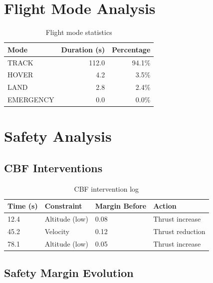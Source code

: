 \section{Flight Mode Analysis}

\begin{table}[htbp]
    \centering
    \caption{Flight mode statistics}
    \label{tab:mode_stats}
    \begin{tabular}{@{}lrr@{}}
        \toprule
        \textbf{Mode} & \textbf{Duration (s)} & \textbf{Percentage} \\
        \midrule
        TRACK & 112.0 & 94.1\% \\
        HOVER & 4.2 & 3.5\% \\
        LAND & 2.8 & 2.4\% \\
        EMERGENCY & 0.0 & 0.0\% \\
        \bottomrule
    \end{tabular}
\end{table}

\section{Safety Analysis}

\subsection{CBF Interventions}

\begin{table}[htbp]
    \centering
    \caption{CBF intervention log}
    \label{tab:cbf_log}
    \begin{tabular}{@{}llll@{}}
        \toprule
        \textbf{Time (s)} & \textbf{Constraint} & \textbf{Margin Before} & \textbf{Action} \\
        \midrule
        12.4 & Altitude (low) & 0.08 & Thrust increase \\
        45.2 & Velocity & 0.12 & Thrust reduction \\
        78.1 & Altitude (low) & 0.05 & Thrust increase \\
        \bottomrule
    \end{tabular}
\end{table}

\subsection{Safety Margin Evolution}


